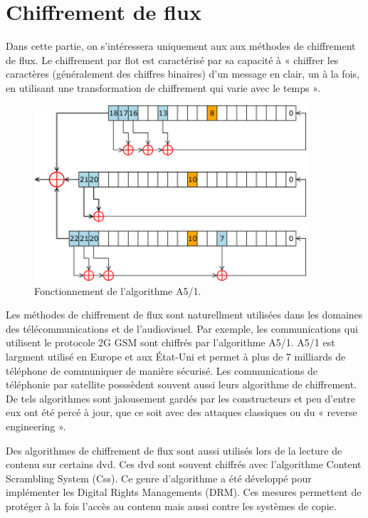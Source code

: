 			\section{Chiffrement de flux}
			
			Dans cette partie, on s'intéressera uniquement aux aux méthodes de chiffrement de flux.
			Le chiffrement par flot est caractérisé par sa capacité à « chiffrer les caractères (généralement des chiffres binaires) d'un message en clair, un à la fois,
			en utilisant une transformation de chiffrement qui varie avec le temps »\cite{appliedCrypto}.
			
			\begin{figure}[!h]
				\centering
				\includegraphics[width=0.9\textwidth]{imgs/application/A5.png}
				\caption{Fonctionnement de l'algorithme A5/1.}
				\label{algoA5}
			\end{figure}
			
			Les méthodes de chiffrement de flux sont naturellment utilisées dans les domaines des télécommunications et de l'audiovisuel.
			Par exemple, les communications qui utilisent le protocole 2G GSM sont chiffrés par l'algorithme A5/1.
			A5/1 est largment utilisé en Europe et aux État-Uni et permet à plus de 7 milliards de téléphone de communiquer de manière sécurisé\cite{7milliards}.
			Les communications de téléphonie par satellite posssèdent souvent aussi leurs algorithme de chiffrement.
			De tels algorithmes sont jalousement gardés par les constructeurs et peu d'entre eux ont été percé à jour, que ce soit avec des attaques classiques ou du « reverse engineering ».
			
			Des algorithmes de chiffrement de flux sont aussi utilisés lors de la lecture de contenu sur certains dvd. Ces dvd sont souvent chiffrés avec l'algorithme Content Scrambling System (Css).
			Ce genre d'algorithme a été développé pour implémenter les Digital Rights Managements (DRM). Ces mesures permettent de protéger à la fois l'accès au contenu mais aussi contre les systèmes de copie.
			
